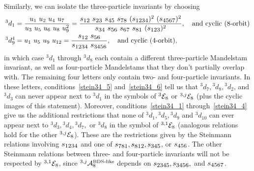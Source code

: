 \documentclass[11pt]{article}
\def\mand#1{\scaleto{s}{4.6pt}_{\scaleto{#1}{5.2pt}}}
\begin{document}
Similarly, we can isolate the three-particle invariants by choosing
\begin{align}
{}^3 d_1 &= \frac{u_1 \ u_2 \ u_4 \ u_7}{u_3 \ u_5 \ u_6 \ u_8 \ u_9^2} = \frac{\mand{12} \ \mand{23} \ \mand{45} \ \mand{78} \ (\mand{1234})^2 \ (\mand{4567})^2}{\mand{34} \ \mand{56} \ \mand{67} \ \mand{81} \ (\mand{123})^2}, \quad \text{and cyclic (8-orbit)} \\
{}^3 d^4_9 &= u_1 \ u_5 \ u_9 \ u_{12} = \frac{\mand{12} \ \mand{56}}{\mand{1234} \ \mand{3456}}, \quad \text{and cyclic (4-orbit)},
\end{align}
in which case ${}^3 d_1$ through ${}^3 d_8$ each contain a different three-particle Mandelstam invariant, as well as four-particle Mandelstams that they don't partially overlap with. The remaining four letters only contain two- and four-particle invariants. In these letters, conditions~\eqref{stein34_5} and~\eqref{stein34_6} tell us that ${}^3 d_7, {}^3 d_8, {}^3 d_2$, and ${}^3 d_3$ can never appear next to ${}^3 d_1$ in the symbols of ${}^{3} {\cal E}_8$ or ${}^{3,j} {\cal E}_8$ (plus the cyclic images of this statement). Moreover, conditions~\eqref{stein34_1} through~\eqref{stein34_4} give us the additional restrictions that none of ${}^3 d_1, {}^3 d_5, {}^3 d_9$ and ${}^3 d_{10}$ can ever appear next to ${}^3 d_3, {}^3 d_4, {}^3 d_7,$ or ${}^3 d_8$ in the symbol of ${}^{3,1} {\cal E}_8$ (analogous relations hold for the other ${}^{3,j} {\cal E}_8$). These are the restrictions given by the Steinmann relations involving $\mand{1234}$ and one of $\mand{781}, \mand{812}, \mand{345}$, or $\mand{456}$. The other Steinmann relations between three- and four-particle invariants will not be respected by ${}^{3,1} {\cal E}_8$, since ${}^{3,j} {\cal A}^{\text{BDS-like}}_{8}$ depends on $\mand{2345}, \mand{3456},$ and $\mand{4567}$.
\fi



\end{document}
